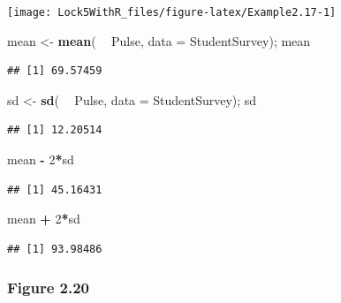 \documentclass[]{book}
\newenvironment{Shaded}{\begin{snugshade}}{\end{snugshade}}
\newcommand{\DataTypeTok}[1]{\textcolor[rgb]{0.13,0.29,0.53}{#1}}
\newcommand{\DecValTok}[1]{\textcolor[rgb]{0.00,0.00,0.81}{#1}}
\newcommand{\KeywordTok}[1]{\textcolor[rgb]{0.13,0.29,0.53}{\textbf{#1}}}
\newcommand{\NormalTok}[1]{#1}
\newcommand{\OperatorTok}[1]{\textcolor[rgb]{0.81,0.36,0.00}{\textbf{#1}}}
\newcommand{\StringTok}[1]{\textcolor[rgb]{0.31,0.60,0.02}{#1}}
\begin{document}
\texttt{[image: Lock5WithR\_files/figure-latex/Example2.17-1]}

\begin{Shaded}
\begin{Highlighting}[]
\NormalTok{mean <-}\StringTok{ }\KeywordTok{mean}\NormalTok{( }\OperatorTok{~}\StringTok{ }\NormalTok{Pulse, }\DataTypeTok{data =}\NormalTok{ StudentSurvey); mean}
\end{Highlighting}
\end{Shaded}

\begin{verbatim}
## [1] 69.57459
\end{verbatim}

\begin{Shaded}
\begin{Highlighting}[]
\NormalTok{sd <-}\StringTok{ }\KeywordTok{sd}\NormalTok{( }\OperatorTok{~}\StringTok{ }\NormalTok{Pulse, }\DataTypeTok{data =}\NormalTok{ StudentSurvey); sd}
\end{Highlighting}
\end{Shaded}

\begin{verbatim}
## [1] 12.20514
\end{verbatim}

\begin{Shaded}
\begin{Highlighting}[]
\NormalTok{mean }\OperatorTok{-}\StringTok{ }\DecValTok{2}\OperatorTok{*}\NormalTok{sd}
\end{Highlighting}
\end{Shaded}

\begin{verbatim}
## [1] 45.16431
\end{verbatim}

\begin{Shaded}
\begin{Highlighting}[]
\NormalTok{mean }\OperatorTok{+}\StringTok{ }\DecValTok{2}\OperatorTok{*}\NormalTok{sd}
\end{Highlighting}
\end{Shaded}

\begin{verbatim}
## [1] 93.98486
\end{verbatim}

\hypertarget{figure-2.20}{%
\subsubsection{Figure 2.20}\label{figure-2.20}}
\end{document}
